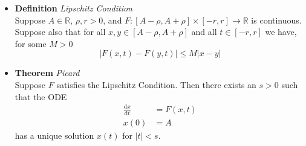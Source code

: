 \documentclass[11pt,a4paper]{article}
\begin{document}
\begin{itemize}

    \item \textbf{Definition} \emph{Lipschitz Condition} \\
        Suppose $A \in \mathbb{R}$, $\rho, r > 0$, and
        $F : [A - \rho, A + \rho] \times [-r, r] \to \mathbb{R}$ is continuous.
        Suppose also that for all $x, y \in [A - \rho, A + \rho]$ and all $t \in [-r, r]$
        we have, for some $M > 0$
        \[
            | F(x, t) - F(y, t) | \leq M|x-y|
        \]

    \item \textbf{Theorem} \emph{Picard} \\
        Suppose $F$ satisfies the Lipschitz Condition.
        Then there exists an $s > 0$ such that the ODE
        \begin{align*}{}
            \frac{\mathrm{d}x}{\mathrm{d}t} &= F(x, t) \\
            x(0) &= A
        \end{align*}
        has a unique solution $x(t)$ for $|t| < s$.

\end{itemize}
\end{document}
